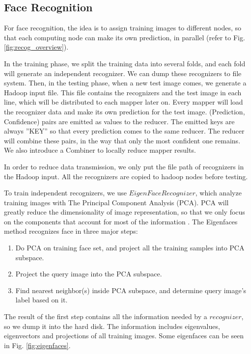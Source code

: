 \documentclass[11pt, draftclsnofoot, onecolumn]{IEEEtran}
\begin{document}
\subsection{Face Recognition}

For face recognition, the idea is to assign training images to different nodes, so that each computing node can make its own prediction, in parallel (refer to Fig. \ref{fig:recog_overview}). 

In the training phase, we split the training data into several folds, and each fold will generate an independent recognizer. We can dump these recognizers to file system. Then, in the testing phase, when a new test image comes, we generate a Hadoop input file. This file contains the recognizers and the test image in each line, which will be distributed to each mapper later on. Every mapper will load the recognizer data and make its own prediction for the test image. (Prediction, Confidence) pairs are emitted as values to the reducer. The emitted keys are always ''KEY'' so that every prediction comes to the same reducer. The reducer will combine these pairs, in the way that only the most confident one remains. We also introduce a Combiner to locally reduce mapper results.

In order to reduce data transmission, we only put the file path of recognizers in the Hadoop input. All the recognizers are copied to hadoop nodes before testing.

To train independent recognizers, we use $EigenFaceRecognizer$, which analyze training images with The Principal Component Analysis (PCA). PCA will greatly reduce the dimensionality of image representation, so that we only focus on the components that account for most of the information \cite{faceRecognizer}. The Eigenfaces method recognizes face in three major steps:

\begin{enumerate}
\item Do PCA on training face set, and project all the training samples into PCA subspace.
\item Project the query image into the PCA subspace.
\item Find nearest neighbor(s) inside PCA subspace, and determine query image’s label based on it.
\end{enumerate}

The result of the first step contains all the information needed by a $recognizer$, so we dump it into the hard disk. The information includes eigenvalues, eigenvectors and projections of all training images. Some eigenfaces can be seen in Fig. \ref{fig:eigenfaces}.
\end{document}
